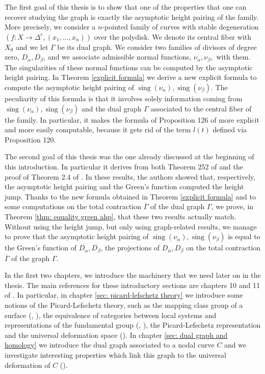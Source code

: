 \documentclass[a4paper,12 pt,titlepage,twoside]{book}
\DeclareMathOperator{\sing}{sing}
\theoremstyle{plain}
\theoremstyle{theorem}
\theoremstyle{definition}
\theoremstyle{remark}
\begin{document}
	The first goal of this thesis is to show that one of the properties that one can recover studying the graph is exactly the asymptotic height pairing of the family. More precisely, we consider a $n$-pointed family of curves with stable degeneration $(f \colon X \rightarrow \Delta^r, (x_1, \dots, x_n))$ over the polydisk. We denote its central fiber with $X_0$ and we let $\Gamma$ be its dual graph. We consider two families of divisors of degree zero, $D_\alpha, D_\beta$, and we associate admissible normal functions, $\nu_\alpha, \nu_\beta,$ with them. The singularities of these normal functions can be computed by the asymptotic height pairing. In Theorem \ref{explicit formula} we derive a new explicit formula to compute the asymptotic height pairing of $\sing(\nu_\alpha), \sing(\nu_\beta)$. The peculiarity of this formula is that it involves solely information coming from $\sing(\nu_\alpha), \sing(\nu_\beta)$ and the dual graph $\Gamma$ associated to the central fiber of the family. In particular, it makes the formula of Proposition 126 of \cite{MR3983292} more explicit and more easily computable, because it gets rid of the term $l(t)$ defined via Proposition 120.
	
	The second goal of this thesis was the one already discussed at the beginning of this introduction. In particular it derives from both Theorem 252 of \cite{MR3983292} and the proof of Theorem 2.4 of \cite{MR3488379}. In these results, the authors showed that, respectively, the asymptotic height pairing and the Green's function computed the height jump. Thanks to the new formula obtained in Theorem \ref{explicit formula} and to some computations on the total contraction $\overline{\Gamma}$ of the dual graph $\Gamma$, we prove, in Theorem \ref{thm: equality green ahp}, that these two results actually match. Without using the height jump, but only using graph-related results, we manage to prove that the asymptotic height pairing of $\sing(\nu_\alpha),\sing(\nu_\beta)$ is equal to the Green's function of $\overline{D_\alpha}, \overline{D_\beta}$, the projections of $D_\alpha, D_\beta$ on the total contraction $\overline{\Gamma}$ of the graph $\Gamma$.
	
	In the first two chapters, we introduce the machinery that we need later on in the thesis. The main references for these introductory sections are chapters 10 and 11 of \cite{MR2807457}.
	In particular, in chapter \ref{sec: picard-lefschetz theory} we introduce some notions of the Picard-Lefschetz theory, such as the mapping class group of a surface (\cite{massuyea2009short}, \cite{wilton_2019}), the equivalence of categories between local systems and representations of the fundamental group (\cite{MR3025862}, \cite{achar_2007}), the Picard-Lefschetz representation and the universal deformation space (\cite{MR2807457}).
	In chapter \ref{sec: dual graph and homology} we introduce the dual graph associated to a nodal curve $C$ and we investigate interesting properties which link this graph to the universal deformation of $C$ (\cite{MR2807457}).
	
\end{document}
